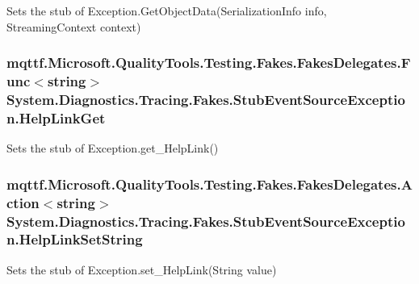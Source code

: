 Sets the stub of Exception.\-Get\-Object\-Data(\-Serialization\-Info info, Streaming\-Context context)

\hypertarget{class_system_1_1_diagnostics_1_1_tracing_1_1_fakes_1_1_stub_event_source_exception_a777e60d156efc8171a57b1321a5b29fa}{
\subsubsection[{Help\-Link\-Get}]{\setlength{\rightskip}{0pt plus 5cm}mqttf.\-Microsoft.\-Quality\-Tools.\-Testing.\-Fakes.\-Fakes\-Delegates.\-Func$<$string$>$ System.\-Diagnostics.\-Tracing.\-Fakes.\-Stub\-Event\-Source\-Exception.\-Help\-Link\-Get}}\label{class_system_1_1_diagnostics_1_1_tracing_1_1_fakes_1_1_stub_event_source_exception_a777e60d156efc8171a57b1321a5b29fa}


Sets the stub of Exception.\-get\-\_\-\-Help\-Link()

\hypertarget{class_system_1_1_diagnostics_1_1_tracing_1_1_fakes_1_1_stub_event_source_exception_a15982756b5fa49dcbaee4be44ee60d2e}{
\subsubsection[{Help\-Link\-Set\-String}]{\setlength{\rightskip}{0pt plus 5cm}mqttf.\-Microsoft.\-Quality\-Tools.\-Testing.\-Fakes.\-Fakes\-Delegates.\-Action$<$string$>$ System.\-Diagnostics.\-Tracing.\-Fakes.\-Stub\-Event\-Source\-Exception.\-Help\-Link\-Set\-String}}\label{class_system_1_1_diagnostics_1_1_tracing_1_1_fakes_1_1_stub_event_source_exception_a15982756b5fa49dcbaee4be44ee60d2e}


Sets the stub of Exception.\-set\-\_\-\-Help\-Link(\-String value)

